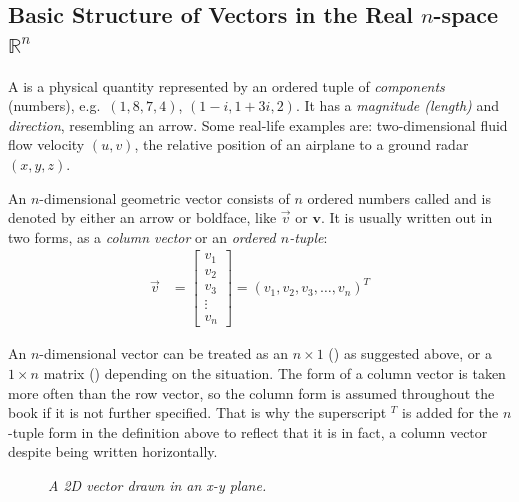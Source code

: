 \subsection{Basic Structure of Vectors in the Real $n$-space $\mathbb{R}^n$}
A  is a physical quantity represented by an ordered tuple of \textit{components} (numbers), e.g.\ $(1, 8, 7, 4)$, $(1-i, 1+3i, 2)$. It has a \textit{magnitude (length)} and \textit{direction}, resembling an arrow. Some real-life examples are: two-dimensional fluid flow velocity $(u, v)$, the relative position of an airplane to a ground radar $(x, y, z)$.
\begin{defn}
\label{defn:geometvec}
An $n$-dimensional geometric vector consists of $n$ ordered numbers called  and is denoted by either an arrow or boldface, like $\vec{v}$ or $\textbf{v}$. It is usually written out in two forms, as a \textit{column vector} or an \textit{ordered $n$-tuple}:
\begin{align}
\vec{v} &=
\begin{bmatrix}
v_1 \\
v_2 \\
v_3 \\
\vdots \\
v_n
\end{bmatrix}
=
(v_1, v_2, v_3, \ldots, v_n)^T
\end{align}
\end{defn}
An $n$-dimensional vector can be treated as an $n \times 1$ () as suggested above, or a $1 \times n$ matrix () depending on the situation. The form of a column vector is taken more often than the row vector, so the column form is assumed throughout the book if it is not further specified. That is why the superscript $^T$ is added for the $n$-tuple form in the definition above to reflect that it is in fact, a column vector despite being written horizontally. \par
\begin{figure}[ht!]
    \centering
    \caption{\textit{A 2D vector drawn in an x-y plane.}}
\end{figure}
